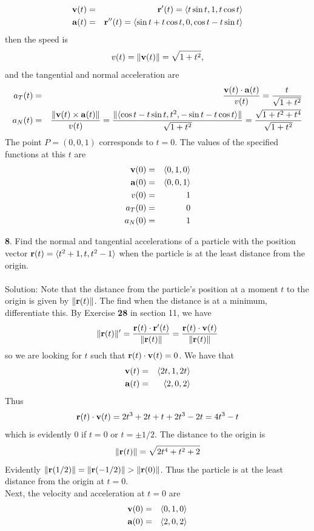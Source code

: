 \documentclass[12pt]{amsbook}
\newcommand{\la}{\langle}
\newcommand{\ra}{\rangle}
\begin{document}
\begin{enumerate}
\begin{eqnarray*}
  {\bf v}(t)&=&{\bf r}'(t)=\la t\sin t, 1, t\cos t\ra\\
  {\bf a}(t)&=&{\bf r}''(t)=\la \sin t +t\cos t,0,\cos t-t\sin t \ra 
  \end{eqnarray*}
  then the speed is
  $$v(t)=\|{\bf v}(t)\|=\sqrt{1+t^2},$$
  and the tangential and normal acceleration are
\begin{eqnarray*}
  a_T(t)&=&\frac{{\bf v}(t)\cdot{\bf a}(t)}{v(t)}=\frac{t}{\sqrt{1+t^2}}\\
  a_N(t)&=&\frac{\|{\bf v}(t)\times{\bf a}(t)\|}{v(t)}=\frac{\|\la \cos t-t\sin t,t^2,-\sin t-t\cos t \ra\|}{\sqrt{1+t^2}}=\frac{\sqrt{1+t^2+t^4}}{\sqrt{1+t^2}}
\end{eqnarray*}  
The point $P=(0,0,1)$ corresponds to $t=0$. The values of the specified functions at this $t$ are
\begin{eqnarray*}
{\bf v}(0)&=&\la 0,1,0 \ra\\
{\bf a}(0)&=&\la 0,0,1 \ra  \\
v(0)&=&1\\
a_T(0)&=&0\\
a_N(0)&=&1
\end{eqnarray*}
\end{enumerate}
{\small\bf 8}. Find the normal and tangential accelerations of a particle with the position
vector ${\bf r}(t)=\la t^2+1,t,t^2-1 \ra$ when the particle is at the least distance
from the origin.
\\
\\
{\sc Solution}: Note that the distance from the particle's position at a moment $t$ to the origin is given by $\|{\bf r}(t)\|$. The find when the distance is at a minimum, differentiate this. By Exercise {\bf 28} in section 11, we have
$$\|{\bf r}(t)\|'=\frac{{\bf r}(t)\cdot {\bf r}'(t)}{\|{\bf r}(t)\|}=\frac{{\bf r}(t)\cdot {\bf v}(t)}{\|{\bf r}(t)\|}$$
so we are looking for $t$ such that ${\bf r}(t)\cdot {\bf v}(t)=0$. We have that
\begin{eqnarray*}
{\bf v}(t)&=&\la 2t,1,2t \ra \\
{\bf a}(t)&=& \la 2,0,2 \ra
\end{eqnarray*}
Thus 
$${\bf r}(t)\cdot {\bf v}(t)=2t^3+2t+t+2t^3-2t=4t^3-t$$
which is evidently $0$ if $t=0$ or $t=\pm 1/2$. The distance to the origin is
$$\|{\bf r}(t)\|=\sqrt{2t^4+t^2+2}$$
Evidently $\|{\bf r}(1/2)\|=\|{\bf r}(-1/2)\|>\|{\bf r}(0)\|$. Thus the particle is at the least distance from the origin at $t=0$.
\\
Next, the velocity and acceleration at $t=0$ are
\begin{eqnarray*}
{\bf v}(0)&=&\la 0,1,0 \ra \\
{\bf a}(0)&=& \la 2,0,2 \ra
\end{eqnarray*}
\end{document}
